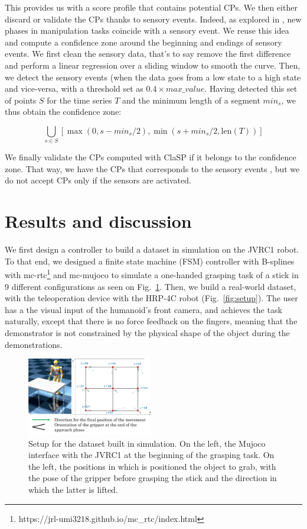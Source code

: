 \documentclass[conference]{IEEEtran}
\begin{document}
This provides us with a score profile that contains potential CPs. We then either discard or validate the CPs thanks to sensory events. Indeed, as explored in \cite{sensory_seg}, new phases in manipulation tasks coincide  with a sensory event. We reuse this idea and compute a confidence zone around the beginning and endings of sensory events. We first clean the sensory data, that's to say remove the first difference and perform a linear regression over a sliding window to smooth the curve. Then,  we detect the sensory events  (when the data goes from a low state to a high  state and vice-versa, with a threshold set as $0.4\times max\_value$. Having detected this set of points $S$ for the time series $T$ and the minimum length of a segment $min_s$, we thus obtain the confidence zone:

\begin{equation}
        \bigcup_{s \in S} \left[ \max(0, s - min_s/2),\min(s + min_s/2, \text{len}(T)) \right]
\end{equation}

We finally validate the CPs computed with ClaSP if it belongs to the confidence zone. That way, we have the CPs that corresponds to the sensory events , but we do not accept CPs only if the sensors are activated.

\section{Results and discussion} \label{results}

 We first design a controller to build a dataset in  simulation on the JVRC1 robot. To that end, we designed a finite state machine (FSM) controller with B-splines with mc-rtc\footnote{https://jrl-umi3218.github.io/mc\_rtc/index.html} and mc-mujoco\cite{singh2023mc} to simulate a one-handed grasping task of a stick in 9 different configurations as seen on Fig.~\ref{fig:simSetup}. Then, we build a real-world dataset, with the teleoperation device  with the HRP-4C robot (Fig.~\ref{fig:setup}). The user has a the visual input of the humanoid's front camera, and achieves the task naturally, except that there is no force  feedback on the fingers, meaning that the demonstrator is not constrained by the physical shape of the object during the demonstrations.

\begin{figure}[t]
  \centering
  \includegraphics[width=0.49\textwidth]{img/simSetup6.pdf}
  \caption{Setup for the dataset built in simulation. On the left, the Mujoco interface with the JVRC1 \cite{jvrc} at the beginning of the grasping task. On the left, the positions in which is positioned the object to grab, with the pose of the gripper before grasping the stick and the direction in which the latter is lifted.}
  \label{fig:simSetup}
\end{figure}
\end{document}
